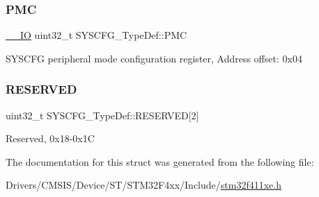 \subsubsection{\texorpdfstring{P\+MC}{PMC}}
{\footnotesize\ttfamily \hyperlink{core__sc300_8h_aec43007d9998a0a0e01faede4133d6be}{\+\_\+\+\_\+\+IO} uint32\+\_\+t S\+Y\+S\+C\+F\+G\+\_\+\+Type\+Def\+::\+P\+MC}

S\+Y\+S\+C\+FG peripheral mode configuration register, Address offset\+: 0x04 \mbox{\label{struct_s_y_s_c_f_g___type_def_a43926e6d31a976a0018b2d1f5c92645d}} 
\subsubsection{\texorpdfstring{R\+E\+S\+E\+R\+V\+ED}{RESERVED}}
{\footnotesize\ttfamily uint32\+\_\+t S\+Y\+S\+C\+F\+G\+\_\+\+Type\+Def\+::\+R\+E\+S\+E\+R\+V\+ED\mbox{[}2\mbox{]}}

Reserved, 0x18-\/0x1C 

The documentation for this struct was generated from the following file\+:\begin{DoxyCompactItemize}
\item 
Drivers/\+C\+M\+S\+I\+S/\+Device/\+S\+T/\+S\+T\+M32\+F4xx/\+Include/\hyperlink{stm32f411xe_8h}{stm32f411xe.\+h}\end{DoxyCompactItemize}
